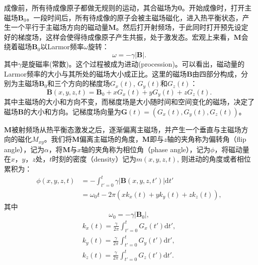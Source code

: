 成像前，所有待成像原子都做无规则的运动，其合磁场为\textbf{0}。开始成像时，打开主磁场$\mathrm{\textbf{B}}_0$。一段时间后，所有待成像的原子会被主磁场磁化，进入热平衡状态，产生一个平行于主磁场方向的磁动量$\mathrm{\textbf{M}}$。然后打开射频场，于此同时打开预先设定好的梯度场，这样会使得待成像原子产生共振，处于激发态。宏观上来看，$\mathrm{\textbf{M}}$会绕着磁场$\mathrm{\textbf{B}}_0$以Larmor频率$\omega$旋转：
\begin{equation}
	\omega=-\gamma|\mathrm{\textbf{B}}|.
\end{equation}
其中$\gamma$是旋磁率(常数)。这个过程被成为进动(procession)。可以看出，磁动量的Larmor频率的大小与其所处的磁场大小成正比。这里的磁场$\mathrm{\textbf{B}}$由四部分构成，分别为主磁场$\mathrm{\textbf{B}}_0$和三个方向的梯度场$G_x(t)$, $G_y(t)$和$G_z(t)$：
\begin{equation}
	\mathrm{\textbf{B}}(x,y,z,t)=\mathrm{\textbf{B}}_0+x G_x(t)+y G_y(t)+z G_z(t).
\end{equation}
 其中主磁场的大小和方向不变，而梯度场是大小随时间和空间变化的磁场，决定了磁场$\mathrm{\textbf{B}}$的大小和方向。记梯度场向量为$\mathrm{\textbf{G}}(t)=(G_x(t),G_y(t),G_z(t))$。
 
 $\mathrm{\textbf{M}}$被射频场从热平衡态激发之后，逐渐偏离主磁场，并产生一个垂直与主磁场方向的磁化$M_{xy}$。我们将$\mathrm{\textbf{M}}$偏离主磁场的角度，$\mathrm{\textbf{M}}$即与$z$轴的夹角称为偏转角（flip angle），记为$\alpha$，将$\mathrm{\textbf{M}}$与$x$轴的夹角称为相位角（phase angle），记为$\phi$，将磁动量在$x$，$y$，$z$处，$t$时刻的密度（density）记为$m(x,y,z,t)$, 则进动的角度或者相位累积为：
 \begin{equation}
 \begin{aligned}
 	 \phi(x,y,z,t)&=-\int_{t'=0}^t \gamma|\mathrm{\textbf{B}}(x,y,z,t')|\mathrm{d}t'\\
 	&=\omega_0t-2\pi(xk_x(t)+yk_y(t)+zk_z(t)),
 \end{aligned}
 \end{equation}
其中
\begin{equation}
	\omega_0=-\gamma|\mathrm{\textbf{B}}_0|,
\end{equation}
\begin{equation}
\begin{aligned}
	k_x(t)=\frac{\gamma}{2\pi}\int_{t'=0}^t G_x(t')\mathrm{d}t',\\
	k_y(t)=\frac{\gamma}{2\pi}\int_{t'=0}^t G_y(t')\mathrm{d}t',\\
	k_z(t)=\frac{\gamma}{2\pi}\int_{t'=0}^t G_z(t')\mathrm{d}t'.
\end{aligned}
\end{equation}

